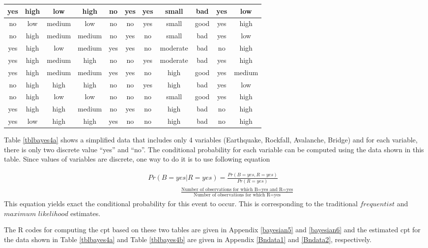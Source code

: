 \begin{table}
\begin{tabular}{|c|c|c|c|c|c|c|c|c|c|c|}
\hline
yes & high & low & high & no & yes & yes & small & bad & yes & low \\ 
\hline
no & low & medium & low & no & no & yes & small & good & yes & high \\ 
\hline
no & high & medium & medium & no & yes & no & small & bad & yes & low \\ 
\hline
yes & high & low & medium & yes & yes & no & moderate & bad & no & high \\ 
\hline
yes & high & medium & high & no & no & yes & moderate & bad & yes & high \\ 
\hline
yes & high & medium & medium & yes & yes & no & high & good & yes & medium \\ 
\hline
no & high & high & high & no & no & yes & high & bad & yes & low \\ 
\hline
no & high & low & low & no & no & no & small & good & yes & high \\ 
\hline
yes & high & high & medium & no & yes & no & high & bad & no & high \\ 
\hline
yes & low & high & high & yes & no & no & high & bad & no & high \\ 
\hline
\end{tabular}
\end{table}

Table \ref{tblbayes4a} shows a simplified data that includes only 4 variables (Earthquake, Rockfall, Avalanche, Bridge) and for each variable, there is only two discrete value ``yes'' and ``no''. The conditional probability for each variable can be computed using the data shown in this table. Since values of variables are discrete, one way to do it is to use following equation

\begin{eqnarray}
 && Pr(B=yes|R=yes)=\frac{Pr(B=yes,R=yes)}{Pr(R=yes)} \label{baynetformula13} \\
 && \hspace{2cm} \frac{\text{Number of observations for which B=yes and R=yes}}{\text{Number of observations for which R=yes}}
\end{eqnarray}
This equation yields exact the conditional probability for this event to occur. This is corresponding to the traditional $frequentist$ and $maximum$ $likelihood$ estimates. 

The R codes for computing the cpt based on these two tables are given in Appendix \ref{bayesian5} and \ref{bayesian6} and the estimated cpt for the data shown in Table \ref{tblbayes4a} and Table \ref{tblbayes4b} are given in Appendix \ref{Bndata1} and \ref{Bndata2}, respectively.
